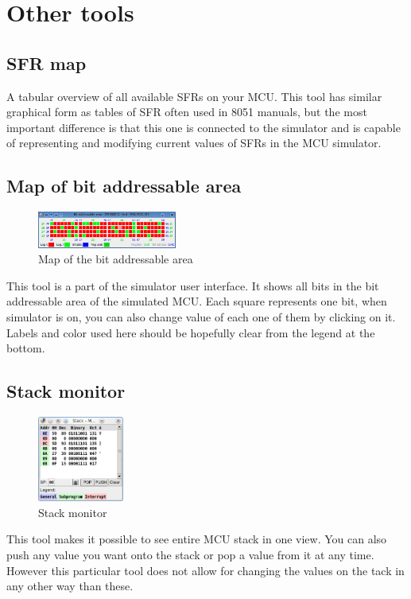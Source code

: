 \documentclass[a4paper,twoside,12pt]{book}
\begin{document}
	\section{Other tools}
		\subsection{SFR map}
			A tabular overview of all available SFRs on your MCU. This tool has similar graphical form as tables of SFR often used in 8051 manuals, but the most important difference is that this one is connected to the simulator and is capable of representing and modifying current values of SFRs in the MCU simulator.

		\subsection{Map of bit addressable area}
			\begin{figure}
				\centering{}
				\includegraphics[width=130pt]{img/017.png}
				\caption{Map of the bit addressable area}
			\end{figure}
			This tool is a part of the simulator user interface. It shows all bits in the bit addressable area of the simulated MCU. Each square represents one bit, when simulator is on, you can also change value of each one of them by clicking on it. Labels and color used here should be hopefully clear from the legend at the bottom.

		\subsection{Stack monitor}
			\begin{figure}
				\centering{}
				\includegraphics[width=80pt]{img/022.png}
				\caption{Stack monitor}
			\end{figure}
			This tool makes it possible to see entire MCU stack in one view. You can also push any value you want onto the stack or pop a value from it at any time. However this particular tool does not allow for changing the values on the tack in any other way than these.
\end{document}
